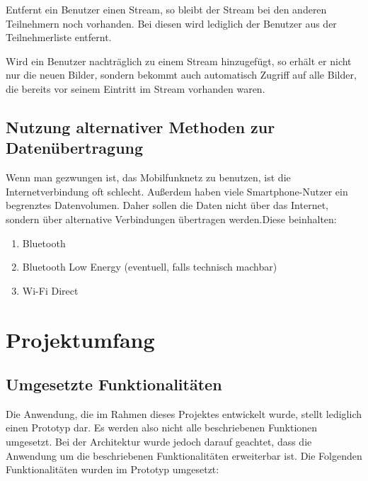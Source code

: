 Entfernt ein Benutzer einen Stream, so bleibt der Stream bei den anderen Teilnehmern noch vorhanden. Bei diesen wird lediglich der Benutzer aus der Teilnehmerliste entfernt.

Wird ein Benutzer nachträglich zu einem Stream hinzugefügt, so erhält er nicht nur die neuen Bilder, sondern bekommt auch automatisch Zugriff auf alle Bilder, die bereits vor seinem Eintritt im Stream vorhanden waren.

\subsection{Nutzung alternativer Methoden zur Datenübertragung}
Wenn man gezwungen ist, das Mobilfunknetz zu benutzen, ist die Internetverbindung oft schlecht. Außerdem haben viele Smartphone-Nutzer ein begrenztes Datenvolumen. Daher sollen die Daten nicht über das Internet, sondern über alternative Verbindungen übertragen werden.Diese beinhalten:

\begin{enumerate}
	\item Bluetooth
	\item Bluetooth Low Energy (eventuell, falls technisch machbar)
	\item Wi-Fi Direct
\end{enumerate}

\section{Projektumfang}

\subsection{Umgesetzte Funktionalitäten}

Die Anwendung, die im Rahmen dieses Projektes entwickelt wurde, stellt lediglich einen Prototyp dar. Es werden also nicht alle beschriebenen Funktionen umgesetzt. Bei der Architektur wurde jedoch darauf geachtet, dass die Anwendung um die beschriebenen Funktionalitäten erweiterbar ist. Die Folgenden Funktionalitäten wurden im Prototyp umgesetzt:

